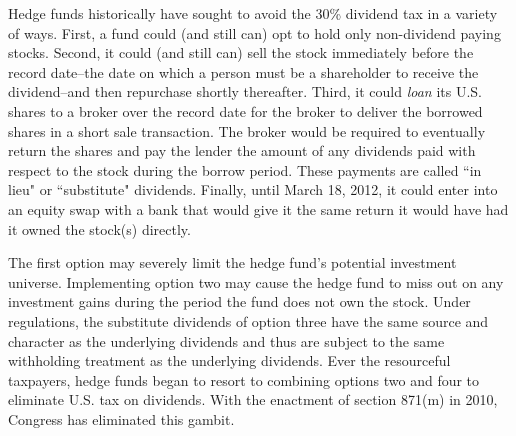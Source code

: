 Hedge funds historically have sought to avoid the 30\% dividend tax in a variety of ways.  First, a fund could (and still can) opt to hold only non-dividend paying stocks.  Second, it could (and still can) sell the stock immediately before the record date--the date on which a person must be a shareholder to receive the dividend--and then repurchase shortly thereafter.  Third, it could \emph{loan} its U.S. shares to a broker over the record date for the broker to deliver the borrowed shares in a short sale transaction.  The broker would be required to eventually return the shares and pay the lender the amount of any dividends paid with respect to the stock during the borrow period.  These payments are called ``in lieu" or ``substitute" dividends.  Finally, until March 18, 2012, it could enter into an equity swap with a bank that would give it the same return it would have had it owned the stock(s) directly.  

The first option may severely limit the hedge fund's potential investment universe.  Implementing option two may cause the hedge fund to miss out on any investment gains during the period the fund does not own the stock.  Under regulations, the substitute dividends of option three have the same source and character as the underlying dividends and thus are subject to the same withholding treatment as the underlying dividends.  Ever the resourceful taxpayers, hedge funds began to resort to combining options two and four to eliminate U.S. tax on dividends.  With the enactment of section 871(m) in 2010, Congress has eliminated  this gambit. 


